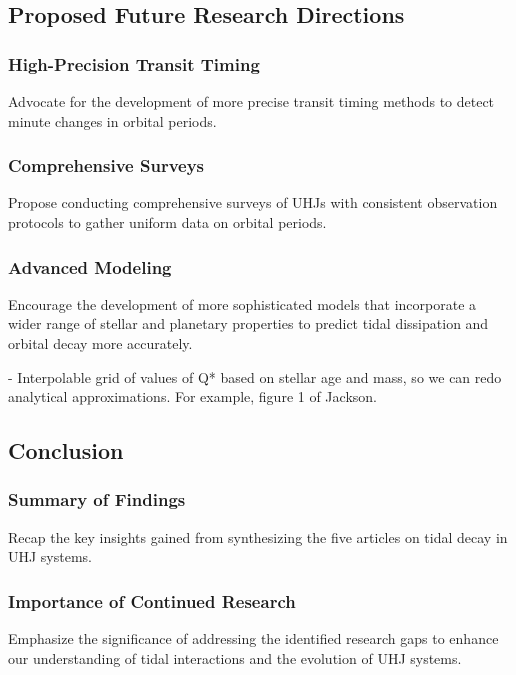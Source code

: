 \documentclass[oneside,12pt]{amsart}
\numberwithin{page}{section}
\begin{document}
\subsection{Proposed Future Research Directions}

\subsubsection{High-Precision Transit Timing}
Advocate for the development of more precise transit timing methods to detect minute changes in orbital periods.

\subsubsection{Comprehensive Surveys}
Propose conducting comprehensive surveys of UHJs with consistent observation protocols to gather uniform data on orbital periods.

\subsubsection{Advanced Modeling}
Encourage the development of more sophisticated models that incorporate a wider range of stellar and planetary properties to predict tidal dissipation and orbital decay more accurately.

- Interpolable grid of values of Q* based on stellar age and mass, so we can redo analytical approximations. For example, figure 1 of Jackson. 





\subsection{Conclusion}

\subsubsection{Summary of Findings}
Recap the key insights gained from synthesizing the five articles on tidal decay in UHJ systems.

\subsubsection{Importance of Continued Research}
Emphasize the significance of addressing the identified research gaps to enhance our understanding of tidal interactions and the evolution of UHJ systems.
\end{document}
